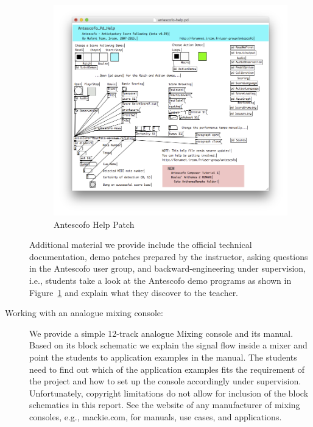 \documentclass[onecolumn,nocopyrightspace,preprint]{sigplanconf}
\begin{document}
\begin{description}
\begin{figure}[ht]
    \centering
    \includegraphics[scale=0.5]{fig/ascohelp.png}
    \caption{Antescofo Help Patch}
    \label{fig:ascohelp}
\end{figure}

Additional material we provide include the official technical documentation,
demo patches prepared by the instructor, asking questions in the Antescofo
user group, and backward-engineering under supervision, i.e., students take a
look at the Antescofo demo programs as shown in Figure~\ref{fig:ascohelp} and
explain what they discover to the teacher.


\item[Working with an analogue mixing console:] We provide a simple 12-track
analogue Mixing console and its manual. Based on its block schematic we
explain the signal flow inside a mixer and point the students to application
examples in the manual. The students need to find out which of the application
examples fits the requirement of the project and how to set up the console
accordingly under supervision. Unfortunately, copyright limitations do not
allow for inclusion of the block schematics in this report. See the website of
any manufacturer of mixing consoles, e.g., mackie.com, for manuals, use cases,
and applications.


\end{description}
\end{document}

